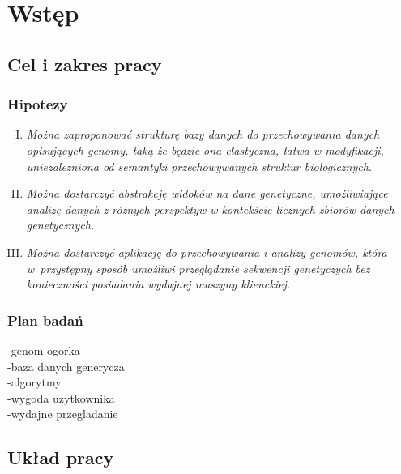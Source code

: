 
\chapter{Wstęp}
\label{section:wstep}

\section{Cel i zakres pracy}
\label{section:cel_i_zakres_pracy}

\subsection{Hipotezy}

\begin{enumerate}[I.]
	\item \textit{
		Można zaproponować strukturę bazy danych do przechowywania danych opisujących genomy, taką że będzie ona elastyczna, łatwa w modyfikacji, uniezależniona od semantyki przechowywanych struktur biologicznych.
		} \\
	
	\item \textit{
		Można dostarczyć abstrakcję widoków na dane genetyczne, umożliwiające analizę danych z różnych perspektyw w kontekście licznych zbiorów
		danych genetycznych.
		} \\
	
	\item \textit{
		Można dostarczyć aplikację do przechowywania i analizy genomów, która w~przystępny sposób umożliwi przeglądanie sekwencji genetyczych bez konieczności posiadania wydajnej maszyny klienckiej. 
		} \\
	
\end{enumerate}

\subsection{Plan badań}
-genom ogorka \\
-baza danych generycza \\
-algorytmy \\
-wygoda uzytkownika \\
-wydajne przegladanie \\

\section{Układ pracy}
\label{section:uklad_pracy}